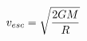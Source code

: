 \documentclass[preview]{standalone}
\begin{document}
\begin{align*}
\special{dvisvgm:raw <g id='unique000'>}v_{esc} = \sqrt{\frac{2GM}{R}}\special{dvisvgm:raw </g>}
\end{align*}
\end{document}
